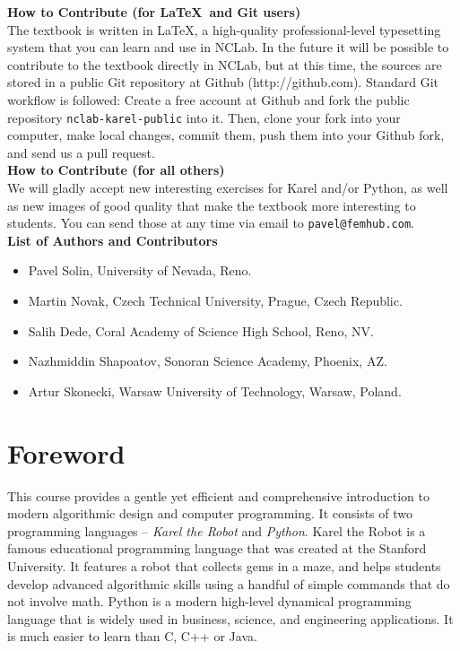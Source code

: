 \documentclass[article,A4,12pt]{llncs}
\begin{document}
\newpage
\noindent
{\bf How to Contribute (for \LaTeX \ and Git users)}\\[4mm]
\noindent
The textbook is written in \LaTeX, a high-quality professional-level typesetting system that 
you can learn and use in NCLab. In the future it will be possible to contribute to 
the textbook directly in NCLab, but at this time, the sources are stored 
in a public Git repository at Github (http://github.com). Standard Git workflow is 
followed: Create a free account at Github and fork the public 
repository {\tt nclab-karel-public} into it. Then, clone your fork into your computer, make local changes, 
commit them, push them into your Github fork, and send us a pull request.  \\[4mm]

\noindent
{\bf How to Contribute (for all others)}\\[4mm]
\noindent
We will gladly accept new interesting exercises for Karel and/or Python, as well as
new images of good quality that make the textbook more interesting to students. You
can send those at any time via email to {\tt pavel@femhub.com}.\\[4mm]

\noindent
{\bf List of Authors and Contributors}
\begin{itemize}
\item Pavel Solin, University of Nevada, Reno. 
\item Martin Novak, Czech Technical University, Prague, Czech Republic.
\item Salih Dede, Coral Academy of Science High School, Reno, NV.
\item Nazhmiddin Shapoatov, Sonoran Science Academy, Phoenix, AZ.
\item Artur Skonecki, Warsaw University of Technology, Warsaw, Poland.
\end{itemize}





\newpage
\setcounter{tocdepth}{2}
\tableofcontents

\newpage

\pagestyle{plain}
\setcounter{page}{1}

\pagestyle{plain}
\setcounter{page}{1}
\section*{Foreword}
This course provides a gentle yet efficient and comprehensive introduction to modern algorithmic 
design and computer programming. It consists of two programming languages -- {\em Karel the Robot} 
and {\em Python}. Karel the Robot is a famous educational programming language that was created 
at the Stanford University. It features a robot that collects gems in a maze, and helps students 
develop advanced algorithmic skills using a handful of simple commands that do not involve math. 
Python is a modern high-level dynamical programming language that is widely used in business, 
science, and engineering applications. It is much easier to learn than C, C++ or Java.
\end{document}
